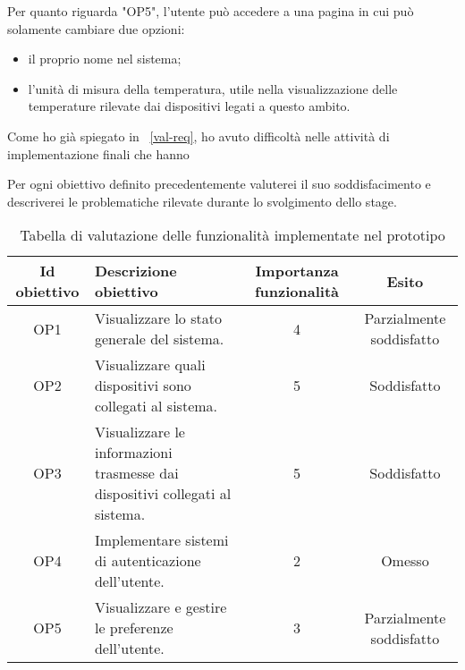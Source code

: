 Per quanto riguarda "OP5", l'utente può accedere a una pagina in cui può solamente cambiare due opzioni:
\begin{itemize}
  \item il proprio nome nel sistema;
  \item l'unità di misura della temperatura, utile nella visualizzazione delle temperature rilevate dai dispositivi legati a questo ambito.
\end{itemize}

Come ho già spiegato in ~\ref{val-req}, ho avuto difficoltà nelle attività di implementazione finali che hanno

Per ogni obiettivo definito precedentemente valuterei il suo soddisfacimento e descriverei le problematiche rilevate durante lo svolgimento dello stage.

\begin{table}[H]
\caption{Tabella di valutazione delle funzionalità implementate nel prototipo}
\label{tab:esito-obiettivi-prodotto}
\begin{tabularx}{\linewidth}{|c|X|c|c|}
\hline
\textbf{Id obiettivo} & \textbf{Descrizione obiettivo} & \textbf{Importanza funzionalità} & \textbf{Esito}\\
\hline
\label{OP1} OP1 & Visualizzare lo stato generale del sistema. & 4 & Parzialmente soddisfatto \\
\hline
\label{OP2} OP2 & Visualizzare quali dispositivi sono collegati al sistema. & 5 & Soddisfatto \\
\hline
\label{OP3} OP3 & Visualizzare le informazioni trasmesse dai dispositivi collegati al sistema. & 5 & Soddisfatto \\
\hline
\label{OP4} OP4 & Implementare sistemi di autenticazione dell'utente. & 2 & Omesso \\
\hline
\label{OP5} OP5 & Visualizzare e gestire le preferenze dell'utente. & 3 & Parzialmente soddisfatto \\
\hline
\end{tabularx}
\end{table}

